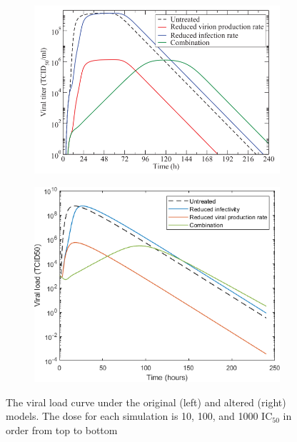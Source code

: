 \documentclass[a4paper,11pt]{article}
\begin{document}
\begin{figure}[ht]
\begin{subfigure}{0.4\textwidth}
    \includegraphics[width=\textwidth]{treatm1000.png}
    \end{subfigure}
    \begin{subfigure}{0.35\textwidth}
    
    \includegraphics[width=\textwidth]{treat1000.png}
    \end{subfigure}
   
    
    \caption{\small The viral load curve under the original (left) and altered (right) models. The dose for each simulation is 10, 100, and 1000 $\mathrm{IC}_{50}$ in order from top to bottom}
    \label{fig:my_label}
\end{figure}
\end{document}
